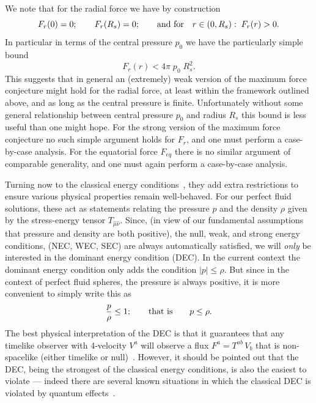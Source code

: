 \documentclass[12pt]{article}
\begin{document}
We note that for the radial force we have by construction
\begin{equation}
F_r(0)=0; \qquad F_r(R_s) = 0; \qquad \hbox{and for} \quad r\in(0,R_s):\; F_r(r) > 0.
\end{equation}
In particular in terms of the central pressure $p_0$ we have the particularly simple bound
\begin{equation}
F_r(r) < 4\pi\; p_0 \; R_s^2.
\end{equation}
This suggests that in general an (extremely) weak version of the maximum force conjecture might hold for the radial force, at least within the framework outlined above, and as long as the central pressure is finite. Unfortunately without some general relationship between central pressure $p_0$ and radius $R_s$ this bound is less useful than one might hope. For the strong version of the maximum force conjecture no such simple argument holds for $F_r$, and one must perform a case-by-case analysis.
%
For the equatorial force $F_{eq}$ there is no similar argument of comparable generality, and one must again perform a case-by-case analysis.

Turning now to the classical energy conditions~\cite{ECs,book,twilight, Visser:1997, Visser:1996, Cattoen:2006, LNP-survey,Martin-Moruno:2013-a,Martin-Moruno:2013-b,Martin-Moruno:2015}, they add extra restrictions to ensure various physical properties remain well-behaved.  For our perfect fluid solutions, these act as statements relating the pressure $p$ and the density $\rho$ given by the stress-energy tensor $T_{\hat{\mu}\hat{\nu}}$.
% 
Since, (in view of our fundamental assumptions that pressure and density are both positive), the null, weak, and strong energy conditions, (NEC, WEC, SEC) are always automatically satisfied, we will \emph{only} be interested in the dominant energy condition (DEC).
%
In the current context the dominant energy condition only adds the condition $|p| \leq \rho$. 
But since in the context of perfect fluid spheres, the pressure is always positive,  it is more convenient to simply write this as
%
\begin{equation}
    \frac{p}{\rho} \leq 1; \qquad \hbox{that is} \qquad p \leq \rho. 
    \label{eq:DEC}
\end{equation}
The best physical interpretation of the DEC is that it guarantees that any timelike observer with 4-velocity $V^a$ will observe a flux $F^a = T^{ab} \,V_b$ that is non-spacelike (either timelike or null)~\cite{LNP-survey}. However, it should be pointed out that the DEC, being the strongest of the classical energy conditions, is also the easiest to violate --- indeed there are several known situations in which the classical DEC is violated by quantum effects~\cite{book, twilight, Visser:1997, Visser:1996, Cattoen:2006, LNP-survey,Martin-Moruno:2013-a,Martin-Moruno:2013-b,Martin-Moruno:2015}. 
\end{document}
